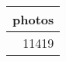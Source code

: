 \begin{table}[ht]
\centering
\begin{tabular}{r}
  \hline
photos \\ 
  \hline
11419 \\ 
   \hline
\end{tabular}
\end{table}

